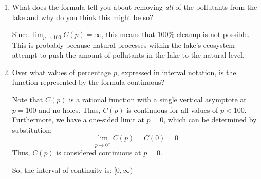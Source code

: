 \documentclass[letterpaper,12pt,fleqn]{article}
\begin{document}
\begin{enumerate}[label={(\alph*)}]
  \bigskip

\item What does the formula tell you about removing \emph{all} of the pollutants from the lake and why do you think
  this might be so?

  \bigskip
  
  Since \(\displaystyle\lim_{p\to100}C(p)=\infty\), this means that \(100\%\) cleanup is not possible.  This is
  probably because natural processes within the lake's ecosystem attempt to push the amount of pollutants in the
  lake to the natural level.
  
  \bigskip
  
\item Over what values of percentage \(p\), expressed in interval notation, is the function represented by the formula
  continuous?

  \bigskip

  Note that \(C(p)\) is a rational function with a single vertical asymptote at \(p=100\) and no holes.  Thus,
  \(C(p)\) is continuous for all values of \(p<100\).  Furthermore, we have a one-sided limit at \(p=0\), which can
  be determined by substitution:
  \[\lim_{p\to0^+}C(p)=C(0)=0\]
  Thus, \(C(p)\) is considered continuous at \(p=0\).

  So, the interval of continuity is: \([0,\infty)\)
\end{enumerate}
\end{document}
